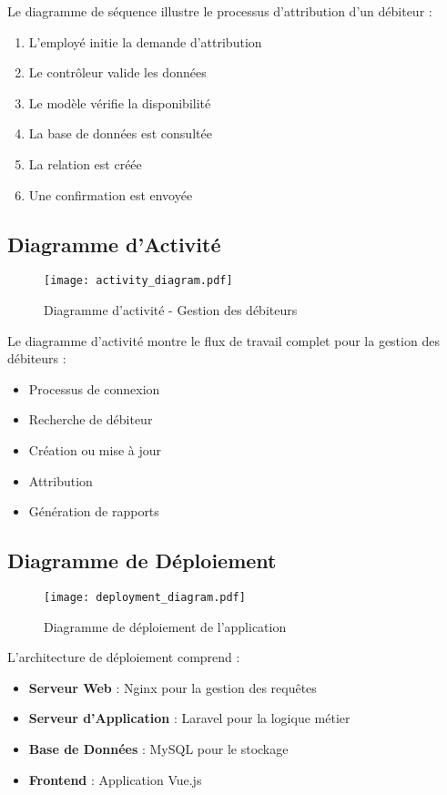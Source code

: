 \documentclass[12pt,a4paper]{report}
\begin{document}
Le diagramme de séquence illustre le processus d'attribution d'un débiteur :
\begin{enumerate}
    \item L'employé initie la demande d'attribution
    \item Le contrôleur valide les données
    \item Le modèle vérifie la disponibilité
    \item La base de données est consultée
    \item La relation est créée
    \item Une confirmation est envoyée
\end{enumerate}

\subsection{Diagramme d'Activité}
\begin{figure}[H]
    \centering
    \texttt{[image: activity\_diagram.pdf]}
    \caption{Diagramme d'activité - Gestion des débiteurs}
    \label{fig:activity_diagram}
\end{figure}

Le diagramme d'activité montre le flux de travail complet pour la gestion des débiteurs :
\begin{itemize}
    \item Processus de connexion
    \item Recherche de débiteur
    \item Création ou mise à jour
    \item Attribution
    \item Génération de rapports
\end{itemize}

\subsection{Diagramme de Déploiement}
\begin{figure}[H]
    \centering
    \texttt{[image: deployment\_diagram.pdf]}
    \caption{Diagramme de déploiement de l'application}
    \label{fig:deployment_diagram}
\end{figure}

L'architecture de déploiement comprend :
\begin{itemize}
    \item \textbf{Serveur Web} : Nginx pour la gestion des requêtes
    \item \textbf{Serveur d'Application} : Laravel pour la logique métier
    \item \textbf{Base de Données} : MySQL pour le stockage
    \item \textbf{Frontend} : Application Vue.js
\end{itemize}
\end{document}
